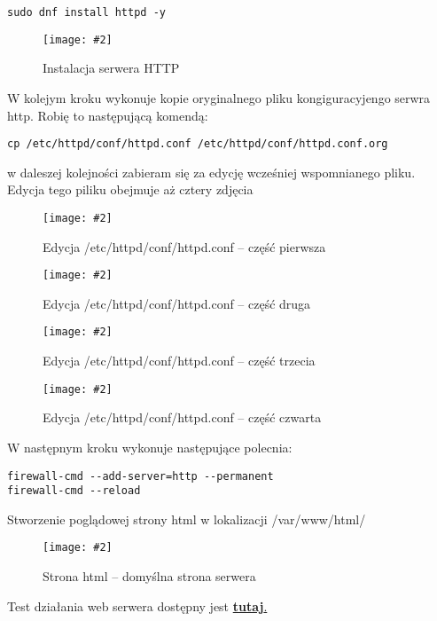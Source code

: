 \documentclass[a4paper]{article}
\newcommand*{\zdj}[2][\textwidth]{\texttt{[image: \#2]}}
\newcommand*{\fg}[4][!htb]{
      \begin{figure*}[#1]
            \zdj{#2}
            \caption[#4]{#3}
      \end{figure*}
}
\begin{document}
\vspace*{-5pt}
\begin{Verbatim}[frame=single]
sudo dnf install httpd -y
\end{Verbatim}
\vspace*{-20pt}
\fg{contents/configuration/HTTP/1.png}{Instalacja serwera HTTP}{Instalacja serwera HTTP}
\vspace*{-10pt}
W kolejym kroku wykonuje kopie oryginalnego pliku kongiguracyjengo serwra http. Robię to następującą komendą: 
\vspace*{-5pt}
\begin{Verbatim}[frame=single]
cp /etc/httpd/conf/httpd.conf /etc/httpd/conf/httpd.conf.org 
\end{Verbatim}
\vspace*{-5pt}
w daleszej kolejności zabieram się za edycję wcześniej wspomnianego pliku. Edycja tego piliku obejmuje aż cztery zdjęcia
\fg{contents/configuration/HTTP/3.png}{Edycja /etc/httpd/conf/httpd.conf – część pierwsza}{Edycja /etc/httpd/conf/httpd.conf – 1}
\newpage
\fg{contents/configuration/HTTP/4.png}{Edycja /etc/httpd/conf/httpd.conf – część druga}{Edycja /etc/httpd/conf/httpd.conf – 2}
\fg{contents/configuration/HTTP/5.png}{Edycja /etc/httpd/conf/httpd.conf – część trzecia}{Edycja /etc/httpd/conf/httpd.conf – 3}
\newpage
\fg{contents/configuration/HTTP/6.png}{Edycja /etc/httpd/conf/httpd.conf – część czwarta}{Edycja /etc/httpd/conf/httpd.conf – 4}
W następnym kroku wykonuje następujące polecnia: 
\begin{Verbatim}[frame=single]
firewall-cmd --add-server=http --permanent
firewall-cmd --reload
\end{Verbatim}
Stworzenie poglądowej strony html w lokalizacji /var/www/html/
\fg{contents/configuration/HTTP/8.png}{Strona html – domyślna strona serwera}{Strona html – domyślna strona serwera}

Test działania web serwera dostępny jest \hyperref[fig:http-test]{\textbf{tutaj}.}
\end{document}
